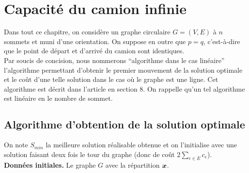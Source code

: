 \chapter{Capacité du camion infinie}

Dans tout ce chapitre, on considère un graphe circulaire $G = (V,E)$ à $n$ sommets et muni d'une orientation. On suppose en outre que $p=q$, c'est-à-dire que le point de départ et d'arrivé du camion sont identiques.
\\

Par soucis de concision, nous nommerons ``algorithme dans le cas linéaire'' l'algorithme permettant d'obtenir le premier mouvement de la solution optimale et le coût d'une telle solution dans le cas où le graphe est une ligne. Cet algorithme est décrit dans l'article \cite{Benchimol2011} en section 8. On rappelle qu'un tel algorithme est linéaire en le nombre de sommet.

\section{Algorithme d'obtention de la solution optimale}

On note $S_{min}$ la meilleure solution réalisable obtenue et on l'initialise avec une solution faisant deux fois le tour du graphe (donc de coût $2\sum_{e \in E}c_e$).
\\

\textbf{Données initiales.} Le graphe $G$ avec la répartition $\boldsymbol{x}$.

